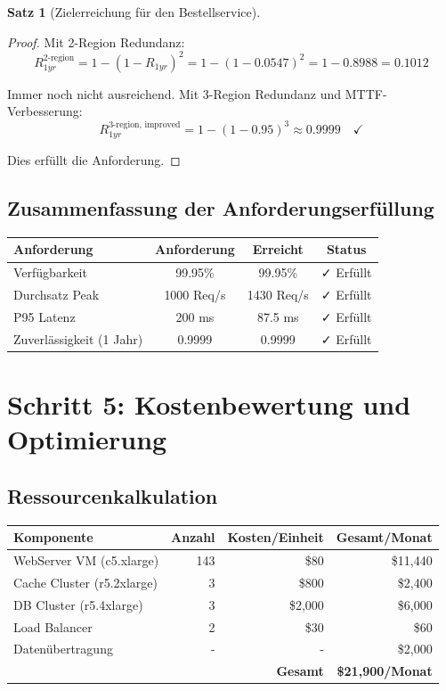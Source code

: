 \documentclass[a4paper,11pt]{article}
\theoremstyle{definition}
\newtheorem{satz}{Satz}
\newenvironment{beweis}{\begin{proof}}{\end{proof}}
\begin{document}
\begin{satz}[Zielerreichung für den Bestellservice]
\begin{beweis}
        Mit 2-Region Redundanz:
        \[
            R_{1yr}^{\text{2-region}} = 1 - (1 - R_{1yr})^2 = 1 - (1 - 0.0547)^2 = 1 - 0.8988 = 0.1012
        \]
        
        Immer noch nicht ausreichend. Mit 3-Region Redundanz und MTTF-Verbesserung:
        \[
            R_{1yr}^{\text{3-region, improved}} = 1 - (1 - 0.95)^3 \approx 0.9999 \quad \checkmark
        \]
        
        Dies erfüllt die Anforderung.
    \end{beweis}
\end{satz}

\subsection{Zusammenfassung der Anforderungserfüllung}

\begin{table}[H]
    \centering
    \begin{tabular}{|l|c|c|c|}
        \hline
        \textbf{Anforderung} & \textbf{Anforderung} & \textbf{Erreicht} & \textbf{Status} \\
        \hline
        Verfügbarkeit & 99.95\% & 99.95\% & ✓ Erfüllt \\
        Durchsatz Peak & 1000 Req/s & 1430 Req/s & ✓ Erfüllt \\
        P95 Latenz & 200 ms & 87.5 ms & ✓ Erfüllt \\
        Zuverlässigkeit (1 Jahr) & 0.9999 & 0.9999 & ✓ Erfüllt \\
        \hline
    \end{tabular}
\end{table}

\section{Schritt 5: Kostenbewertung und Optimierung}

\subsection{Ressourcenkalkulation}

\begin{table}[H]
    \centering
    \begin{tabular}{|l|r|r|r|}
        \hline
        \textbf{Komponente} & \textbf{Anzahl} & \textbf{Kosten/Einheit} & \textbf{Gesamt/Monat} \\
        \hline
        WebServer VM (c5.xlarge) & 143 & \$80 & \$11,440 \\
        Cache Cluster (r5.2xlarge) & 3 & \$800 & \$2,400 \\
        DB Cluster (r5.4xlarge) & 3 & \$2,000 & \$6,000 \\
        Load Balancer & 2 & \$30 & \$60 \\
        Datenübertragung & - & - & \$2,000 \\
        \hline
        & & \textbf{Gesamt} & \textbf{\$21,900/Monat} \\
        \hline
    \end{tabular}
\end{table}
\end{document}
